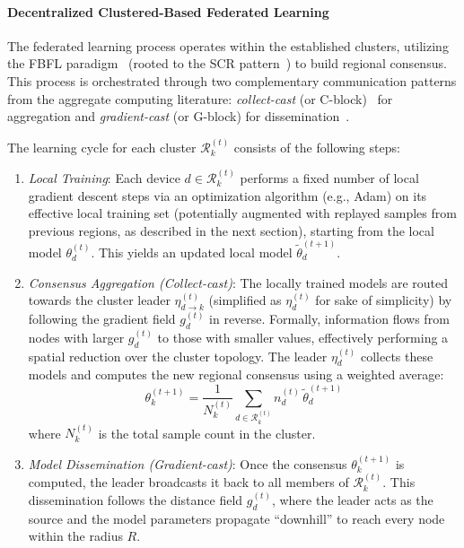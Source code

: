 \documentclass[conference]{IEEEtran}
\theoremstyle{plain}
\theoremstyle{definition}
\begin{document}
\paragraph{Decentralized Clustered-Based Federated Learning}
The federated learning process operates within the established clusters, 
  utilizing the FBFL paradigm~\cite{DBLP:journals/lmcs/DominiAEV26} (rooted to the SCR pattern~\cite{DBLP:journals/fgcs/PianiniCVN21}) to build regional consensus. 
  This process is orchestrated through two complementary communication patterns from the aggregate computing literature: 
  \emph{collect-cast} (or C-block)~\cite{DBLP:conf/atal/AudritoBDV19} for aggregation and \emph{gradient-cast} (or G-block) 
  for dissemination~\cite{DBLP:conf/saso/AudritoCDV17}.

The learning cycle for each cluster $\mathcal{R}_k^{(t)}$ consists of the following steps:
\begin{enumerate}
    \item \emph{Local Training}: 
    Each device $d \in \mathcal{R}_k^{(t)}$ performs a fixed number of local gradient descent steps via an optimization algorithm (e.g., Adam) on its effective local training set (potentially augmented with replayed samples from previous regions, as described in the next section),
    starting from the local model $\theta_d^{(t)}$. 
    This yields an updated local model $\widetilde{\theta}_d^{(t+1)}$.
    \item \emph{Consensus Aggregation (Collect-cast)}: 
    The locally trained models are routed towards the cluster leader $\eta_{d \to k}^{(t)}$ (simplified as $\eta_d^{(t)}$ for sake of simplicity)
    by following the gradient field $g_d^{(t)}$ in reverse. 
    Formally, 
    information flows from nodes with larger $g_d^{(t)}$ to those with smaller values, 
    effectively performing a spatial reduction over the cluster topology. 
    The leader $\eta_d^{(t)}$ collects these models and computes the new regional consensus using a weighted average:
    \begin{equation}
        \theta_k^{(t+1)} = \frac{1}{N_k^{(t)}} \sum_{d \in \mathcal{R}_k^{(t)}} n_d^{(t)} \, \widetilde{\theta}_d^{(t+1)}
    \end{equation}
    where $N_k^{(t)}$ is the total sample count in the cluster.
    \item \emph{Model Dissemination (Gradient-cast)}: 
    Once the consensus $\theta_k^{(t+1)}$ is computed, 
    the leader broadcasts it back to all members of $\mathcal{R}_k^{(t)}$. 
    This dissemination follows the distance field $g_d^{(t)}$, 
    where the leader acts as the source and the model parameters propagate ``downhill'' to reach every node within the radius $R$.
\end{enumerate}
\end{document}
